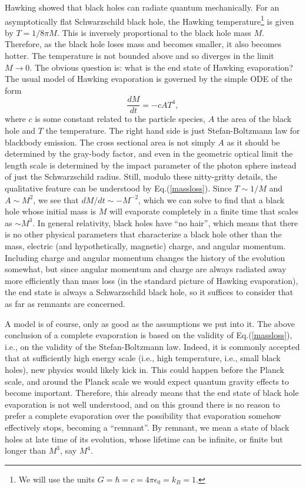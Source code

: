 \documentclass[12pt,preprintnumbers, floatfix, preprintnumbers, letterpaper, superscriptaddress,nofootinbib]{revtex4-2}
\begin{document}
Hawking showed that black holes can radiate quantum mechanically. For an asymptotically flat Schwarzschild black hole, the Hawking temperature\footnote{We will use the units $G=\hbar=c=4\pi\epsilon_0=k_B=1$.} is given by $T=1/8\pi M$. This is inversely proportional to the black hole mass $M$. Therefore, as the black hole loses mass and becomes smaller, it also becomes hotter. The temperature is not bounded above and so diverges in the limit $M \to 0$. The obvious question is: what is the end state of Hawking evaporation? The usual model of Hawking evaporation is governed by the simple ODE of the form
\begin{equation}\label{massloss}
\frac{dM}{dt} = -cAT^4,
\end{equation}
where $c$ is some constant related to the particle species, $A$ the area of the black hole and $T$ the temperature. The right hand side is just Stefan-Boltzmann law for blackbody emission. The cross sectional area is not simply $A$ as it should be determined by the gray-body factor, and even in the geometric optical limit the length scale  is determined by the impact parameter of the photon sphere instead of just the Schwarzschild radius. Still, modulo these nitty-gritty details, the qualitative feature can be understood by Eq.(\ref{massloss}). Since $T\sim 1/M$ and $A \sim M^2$, we see that $dM/dt \sim -M^{-2}$, which we can solve to find that a black hole whose initial mass is $M$ will evaporate completely in a finite time that scales as $\sim M^3$. In general relativity, black holes have ``no hair'', which means that there is no other physical parameters that characterize a black hole other than the mass, electric (and hypothetically, magnetic) charge, and angular momentum. Including charge and angular momentum changes the history of the evolution somewhat, but since angular momentum and charge are always radiated away more efficiently than mass loss (in the standard picture of Hawking evaporation), the end state is always a Schwarzschild black hole, so it suffices to consider that as far as remnants are concerned.

A model is of course, only as good as the assumptions we put into it. The above conclusion of a complete evaporation is based on the validity of Eq.(\ref{massloss}), i.e., on the validity of the Stefan-Boltzmann law. Indeed, it is commonly accepted that at sufficiently high energy scale (i.e., high temperature, i.e., small black holes), new physics would likely kick in. This could happen before the Planck scale, and around the Planck scale we would expect quantum gravity effects to become important. Therefore, this already means that the end state of black hole evaporation is not well understood, and on this ground there is no reason to prefer a complete evaporation over the possibility that evaporation somehow effectively stops, becoming a ``remnant''. By remnant, we mean a state of black holes at late time of its evolution, whose lifetime can be infinite, or finite but longer than $M^3$, say $M^4$. 
\end{document}
